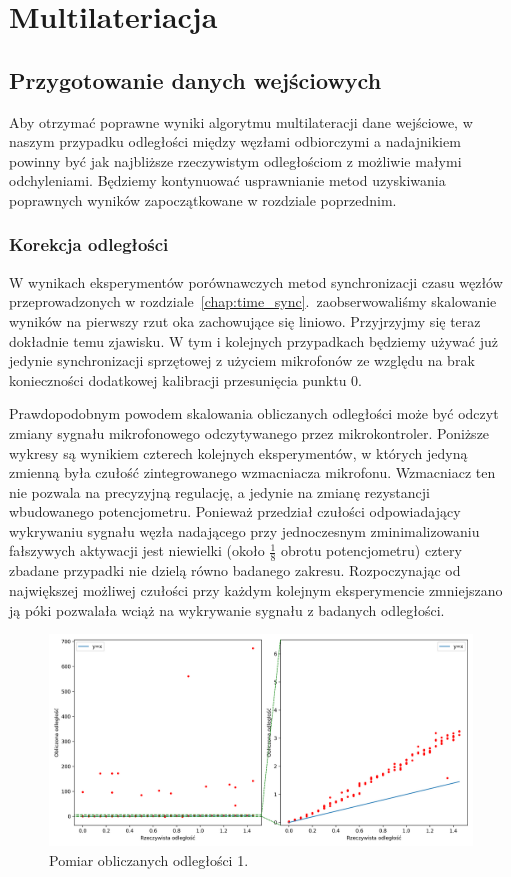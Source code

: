 \chapter{Multilateriacja}\label{chap:multilateration}

\section{Przygotowanie danych wejściowych}

Aby otrzymać poprawne wyniki algorytmu multilateracji dane wejściowe, w naszym przypadku odległości między węzłami odbiorczymi a nadajnikiem powinny być jak najbliższe rzeczywistym odległościom z możliwie małymi odchyleniami. Będziemy kontynuować usprawnianie metod uzyskiwania poprawnych wyników zapoczątkowane w rozdziale poprzednim.

\subsection{Korekcja odległości}

W wynikach eksperymentów porównawczych metod synchronizacji czasu węzłów przeprowadzonych w rozdziale~\ref{chap:time_sync}.\ zaobserwowaliśmy skalowanie wyników na pierwszy rzut oka zachowujące się liniowo. Przyjrzyjmy się teraz dokładnie temu zjawisku. W tym i kolejnych przypadkach będziemy używać już jedynie synchronizacji sprzętowej z użyciem mikrofonów ze względu na brak konieczności dodatkowej kalibracji przesunięcia punktu 0.

Prawdopodobnym powodem skalowania obliczanych odległości może być odczyt zmiany sygnału mikrofonowego odczytywanego przez mikrokontroler. Poniższe wykresy są wynikiem czterech kolejnych eksperymentów, w których jedyną zmienną była czułość zintegrowanego wzmacniacza mikrofonu. Wzmacniacz ten nie pozwala na precyzyjną regulację, a jedynie na zmianę rezystancji wbudowanego potencjometru. Ponieważ przedział czułości odpowiadający wykrywaniu sygnału węzła nadającego przy jednoczesnym zminimalizowaniu fałszywych aktywacji jest niewielki (około $\frac{1}{8}$ obrotu potencjometru) cztery zbadane przypadki nie dzielą równo badanego zakresu. Rozpoczynając od największej możliwej czułości przy każdym kolejnym eksperymencie zmniejszano ją póki pozwalała wciąż na wykrywanie sygnału z badanych odległości.

\begin{figure}[h]
\centering
    \includegraphics[width=\textwidth]{pics/mic_sync_dist/dists_long_0.png}
\caption{Pomiar obliczanych odległości 1.}
\label{pic:slope_test_0}
\end{figure}


